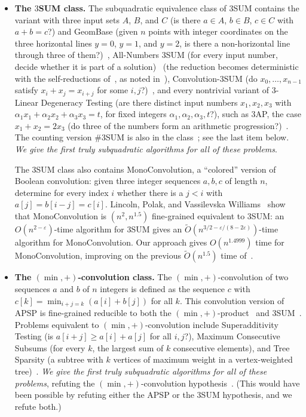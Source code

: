 \begin{itemize}
\item \textbf{The $3$SUM class.} The subquadratic equivalence class of $3$SUM contains the variant with three input sets $A$, $B$, and $C$ (is there $a\in A$, $b\in B$, $c\in C$ with $a+b=c$?) and GeomBase (given $n$ points with integer coordinates on the three horizontal lines $y=0$, $y=1$, and $y=2$, is there a non-horizontal line through three of them?)~\cite{GO95}, All-Numbers $3$SUM (for every input number, decide whether it is part of a solution)~\cite{VW10,VW18} (the reduction becomes deterministic with the self-reductions of~\cite{LVWW16,GP18}, as noted in~\cite{FKP24}), Convolution-3SUM (do $x_0,\dots,x_{n-1}$ satisfy $x_i+x_j=x_{i+j}$ for some $i,j$?)~\cite{Pat10,CH20}, and every nontrivial variant of 3-Linear Degeneracy Testing (are there distinct input numbers $x_1,x_2,x_3$ with $\alpha_1x_1+\alpha_2x_2+\alpha_3x_3=t$, for fixed integers $\alpha_1,\alpha_2,\alpha_3,t$?), such as 3AP, the case $x_1+x_2=2x_3$ (do three of the numbers form an arithmetic progression?)~\cite{DGS20}. The counting version \#3SUM is also in the class~\cite{CVX23,FJX25}; see the last item below. \emph{We give the first truly subquadratic algorithms for all of these problems}.

The $3$SUM class also contains MonoConvolution, a ``colored'' version of Boolean convolution: given three integer sequences $a,b,c$ of length $n$, determine for every index $i$ whether there is a $j<i$ with $a[j]=b[i-j]=c[i]$. Lincoln, Polak, and Vassilevska Williams~\cite[Theorems~7 and~8]{LPV20} show that MonoConvolution is $(n^2, n^{1.5})$ fine-grained equivalent to $3$SUM:  an $O(n^{2-\varepsilon})$-time algorithm for $3$SUM gives an $\tilde O(n^{3/2-\varepsilon/(8-2\varepsilon)})$-time algorithm for MonoConvolution. Our approach gives $O(n^{1.4999})$ time for MonoConvolution, improving on the previous $\tilde O(n^{1.5})$ time of~\cite{LPV20}.

\item \textbf{The $(\min,+)$-convolution class.} The $(\min,+)$-convolution of two sequences $a$ and $b$ of $n$ integers is defined as the sequence $c$ with $c[k]=\min_{i+j=k}(a[i]+b[j])$ for all $k$. This convolution version of APSP is fine-grained reducible to both
 the $(\min,+)$-product~\cite{BCD14} and $3$SUM~\cite{BIS17,CMWW19}. Problems equivalent to $(\min,+)$-convolution include Superadditivity Testing (is $a[i+j]\ge a[i]+a[j]$ for all $i,j$?), Maximum Consecutive Subsums (for every $k$, the largest sum of $k$ consecutive elements), and Tree Sparsity (a subtree with $k$ vertices of maximum weight in a vertex-weighted tree)~\cite{CMWW19}. \emph{We give the first truly subquadratic algorithms for all of these problems}, refuting the $(\min,+)$-convolution hypothesis~\cite{KPS17,CMWW19}. (This would have been possible by refuting either the APSP or the $3$SUM hypothesis, and we refute both.)


\end{itemize}

